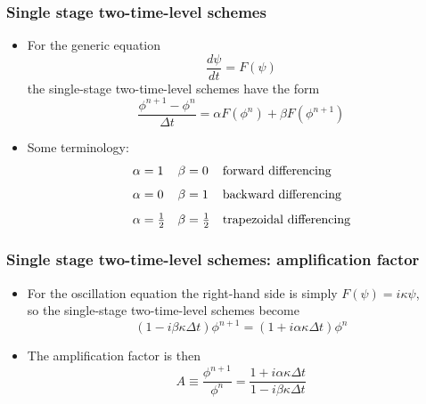 \documentclass[aspectratio=43,9pt]{beamer}
\begin{document}
%
%
\begin{frame}
	\frametitle{Single stage two-time-level schemes}
	\begin{itemize}
		\item For the generic equation
			\begin{equation*}
				\frac{d \psi}{dt} = F ( \psi)
			\end{equation*}
			the single-stage two-time-level schemes have the form
			\begin{equation*}
				\frac{\phi^{n+1} - \phi^n}{\Delta t} = \alpha F(\phi^n) + \beta F(\phi^{n+1})
			\end{equation*}
	\pause
		\item Some terminology:
			\begin{align*}
				\alpha &=1 & \beta &=0 && \text{forward differencing} \\[1ex]
				\alpha &=0 & \beta &=1 && \text{backward differencing} \\[1ex]
				\alpha &= {\textstyle\frac{1}{2}} & \beta &= {\textstyle\frac{1}{2}} && \text{trapezoidal differencing}
			\end{align*}
	\end{itemize}
\end{frame}
%
%
%
\begin{frame}
	\frametitle{Single stage two-time-level schemes: amplification factor}
	\begin{itemize}
		\item For the oscillation equation the right-hand side is simply $F(\psi)=i\kappa\psi$,\\ so the single-stage two-time-level schemes become
			\begin{equation*}
				\left(1 - i \beta \kappa \Delta t\right) \phi^{n+1} = \left( 1 + i \alpha \kappa \Delta t \right) \phi^n
			\end{equation*}
		\item The amplification factor is then
			\begin{equation*}
				A \equiv \frac{\phi^{n+1}}{\phi^{n}} = \frac{1 + i \alpha \kappa \Delta t}{1 - i \beta \kappa \Delta t}
			\end{equation*}
	\end{itemize}
\end{frame}
%
%
%
\end{document}

